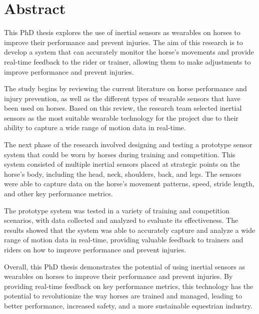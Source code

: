 \chapter*{Abstract}

This PhD thesis explores the use of inertial sensors as wearables on horses to improve their performance and prevent injuries. The aim of this research is to develop a system that can accurately monitor the horse's movements and provide real-time feedback to the rider or trainer, allowing them to make adjustments to improve performance and prevent injuries.

The study begins by reviewing the current literature on horse performance and injury prevention, as well as the different types of wearable sensors that have been used on horses. Based on this review, the research team selected inertial sensors as the most suitable wearable technology for the project due to their ability to capture a wide range of motion data in real-time.

The next phase of the research involved designing and testing a prototype sensor system that could be worn by horses during training and competition. This system consisted of multiple inertial sensors placed at strategic points on the horse's body, including the head, neck, shoulders, back, and legs. The sensors were able to capture data on the horse's movement patterns, speed, stride length, and other key performance metrics.

The prototype system was tested in a variety of training and competition scenarios, with data collected and analyzed to evaluate its effectiveness. The results showed that the system was able to accurately capture and analyze a wide range of motion data in real-time, providing valuable feedback to trainers and riders on how to improve performance and prevent injuries.

Overall, this PhD thesis demonstrates the potential of using inertial sensors as wearables on horses to improve their performance and prevent injuries. By providing real-time feedback on key performance metrics, this technology has the potential to revolutionize the way horses are trained and managed, leading to better performance, increased safety, and a more sustainable equestrian industry.
\mainrq







